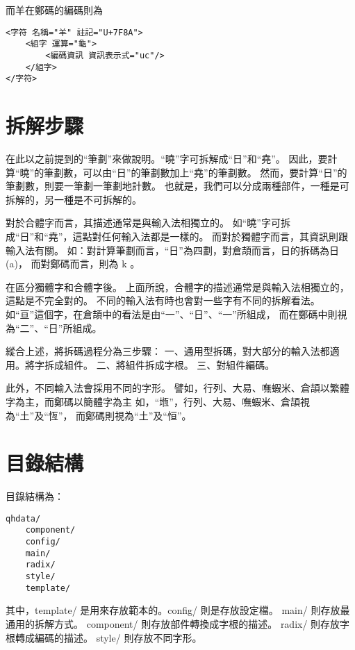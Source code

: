 而羊在鄭碼的編碼則為
\listXML\begin{lstlisting}
<字符 名稱="羊" 註記="U+7F8A">
	<組字 運算="龜">
		<編碼資訊 資訊表示式="uc"/>
	</組字>
</字符>
\end{lstlisting}


\section{拆解步驟}
在此以之前提到的``筆劃''來做說明。``曉''字可拆解成``日''和``堯''。
因此，要計算``曉''的筆劃數，可以由``日''的筆劃數加上``堯''的筆劃數。
然而，要計算``日''的筆劃數，則要一筆劃一筆劃地計數。
也就是，我們可以分成兩種部件，一種是可拆解的，另一種是不可拆解的。

對於合體字而言，其描述通常是與輸入法相獨立的。
如``曉''字可拆成``日''和``堯''，這點對任何輸入法都是一樣的。
而對於獨體字而言，其資訊則跟輸入法有關。
如：對計算筆劃而言，``日''為四劃，對倉頡而言，日的拆碼為日(a)，
而對鄭碼而言，則為 k 。

在區分獨體字和合體字後。
上面所說，合體字的描述通常是與輸入法相獨立的，這點是不完全對的。
不同的輸入法有時也會對一些字有不同的拆解看法。
如``亘''這個字，在倉頡中的看法是由``一''、``日''、``一''所組成，
而在鄭碼中則視為``二''、``日''所組成。

縱合上述，將拆碼過程分為三步驟：
一、通用型拆碼，對大部分的輸入法都適用。將字拆成組件。
二、將組件拆成字根。
三、對組件編碼。

此外，不同輸入法會採用不同的字形。
譬如，行列、大易、嘸蝦米、倉頡以繁體字為主，而鄭碼以簡體字為主
如，``堩''，行列、大易、嘸蝦米、倉頡視為``土''及``恆''，
而鄭碼則視為``土''及``恒''。


\section{目錄結構}
目錄結構為：
\begin{lstlisting}
qhdata/
	component/
	config/
	main/
	radix/
	style/
	template/
\end{lstlisting}

其中，template/ 是用來存放範本的。config/ 則是存放設定檔。
main/ 則存放最通用的拆解方式。
component/ 則存放部件轉換成字根的描述。
radix/ 則存放字根轉成編碼的描述。
style/ 則存放不同字形。


